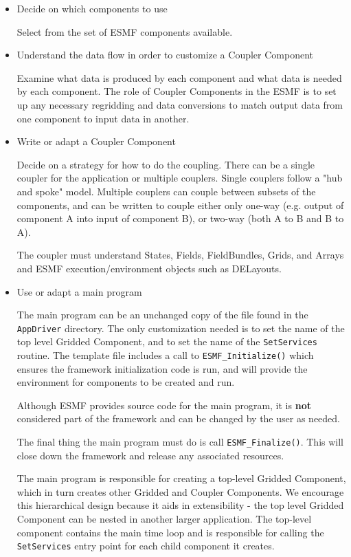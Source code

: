 \begin{itemize}

\item Decide on which components to use 

Select from the set of ESMF components available.

\item Understand the data flow in order to customize a Coupler Component

Examine what data is produced by each component and what data is
needed by each component.  The role of Coupler Components in the
ESMF is to set up any necessary regridding and data conversions
to match output data from one component to input data in another.

\item Write or adapt a Coupler Component

Decide on a strategy for how to do the coupling.  There can be a single
coupler for the application or multiple couplers.
Single couplers follow a "hub and
spoke" model.
Multiple couplers can couple between subsets of the components, and
can be written to couple either only one-way
(e.g. output of component A into input of component B), or two-way
(both A to B and B to A).  

The coupler must understand States, Fields, FieldBundles, 
Grids, and Arrays and ESMF execution/environment objects
such as DELayouts.    

\item Use or adapt a main program 

The main program can be an unchanged copy of the file found in
the {\tt AppDriver} directory.  The only customization needed is to
set the name of the top level Gridded Component, and to set the
name of the {\tt SetServices} routine.  The template file includes
a call to {\tt ESMF\_Initialize()} which ensures the framework
initialization code is run, and will
provide the environment for components to be created and run.

Although ESMF provides source code for the main program, it is
{\bf not} considered part of the framework and can be changed by
the user as needed.

The final thing the main program must do is call {\tt ESMF\_Finalize()}.
This will close down the framework and release any associated resources.

The main program is responsible for creating a top-level
Gridded Component, which in turn creates other Gridded and Coupler 
Components.  We encourage this hierarchical design because it
aids in extensibility - the top level Gridded Component can be
nested in another larger application.
The top-level component contains the main time loop and is 
responsible for calling the
{\tt SetServices} entry point for each child component it creates.

\end{itemize}



